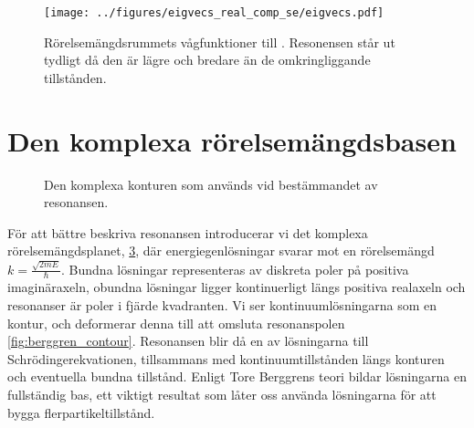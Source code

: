 \documentclass[12pt,a4paper]{article}
\begin{document}
\begin{figure}[ht]
  \centering
  	\texttt{[image: ../figures/eigvecs\_real\_comp\_se/eigvecs.pdf]}

  \caption{Rörelsemängdsrummets vågfunktioner till . Resonensen står ut tydligt då den är lägre och bredare än de omkringliggande tillstånden.} 
  \label{fig:resonance_wavfunction}
\end{figure}

\begin{figure}[h]
  \label{fig:resonance_wavefunction}
  \end{figure}
  
\section{Den komplexa rörelsemängdsbasen}

\begin{figure}[t]
  \centering
  \caption{Den komplexa konturen som används vid bestämmandet av resonansen.}
  \label{fig:simple_contour}
\end{figure}

För att bättre beskriva resonansen introducerar vi det komplexa rörelsemängdsplanet, \cref{fig:simple_contour}, där energiegenlösningar svarar mot en rörelsemängd $k = \frac{\sqrt{2mE}}{{\hbar}}$.
Bundna lösningar representeras av diskreta poler på positiva imaginäraxeln, obundna lösningar ligger kontinuerligt längs positiva realaxeln och resonanser är poler i fjärde kvadranten.
Vi ser kontinuumlösningarna som en kontur, och deformerar denna till att omsluta resonanspolen \cref{fig:berggren_contour}. 
Resonansen blir då en av lösningarna till Schrödingerekvationen, tillsammans med kontinuumtillstånden längs konturen och eventuella bundna tillstånd.
Enligt Tore Berggrens teori bildar lösningarna en fullständig bas, ett viktigt resultat som låter oss använda lösningarna för att bygga flerpartikeltillstånd.
\end{document}

